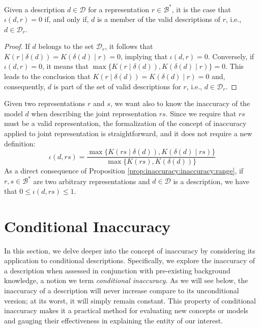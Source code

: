 \begin{proposition}\label{prop:perfect_description}
Given a description $d \in \mathcal{D}$ for a representation $r \in \mathcal{B}^\ast$, it is the case that $\iota(d, r) = 0$ if, and only if, $d$ is a member of the valid descriptions of $r$, i.e., $d \in \mathcal{D}_r$.
\end{proposition}
\begin{proof}
If $d$ belongs to the set $\mathcal{D}_r$, it follows that $K \left( r \mid \delta(d) \right) = K \left( \delta(d) \mid r \right) = 0$, implying that $\iota(d, r) = 0$. Conversely, if $\iota(d, r) = 0$, it means that $\max\{ K \left( r \mid \delta(d) \right), K \left( \delta(d) \mid r \right) \} = 0$. This leads to the conclusion that $K \left( r \mid \delta(d) \right) = K \left( \delta(d) \mid r \right) = 0$ and, consequently, $d$ is part of the set of valid descriptions for $r$, i.e., $d \in \mathcal{D}_r$.
\end{proof}

Given two representations $r$ and $s$, we want also to know the inaccuracy of the model $d$ when describing the joint representation $rs$. Since we require that $rs$ must be a valid representation, the formalization of the concept of inaccuracy applied to joint representation is straightforward, and it does not require a new definition:
\[
\iota(d, rs) = \frac{ \max\{ K \left(rs \mid \delta(d) \right), K \left( \delta(d) \mid rs \right) \} } { \max\{ K(rs), K \left(\delta(d) \right) \} }
\]
As a direct consequence of Proposition \ref{prop:inaccuracy:inaccuracy:range}, if $r, s \in \mathcal{B}^\ast$ are two arbitrary representations and $d \in \mathcal{D}$ is a description, we have that $0 \leq \iota(d, rs) \leq 1$.

%
%

\section{Conditional Inaccuracy}

In this section, we delve deeper into the concept of inaccuracy by considering its application to conditional descriptions. Specifically, we explore the inaccuracy of a description when assessed in conjunction with pre-existing background knowledge, a notion we term \emph{conditional inaccuracy}. As we will see below, the inaccuracy of a description will never increase compare to its unconditional version; at its worst, it will simply remain constant. This property of conditional inaccuracy makes it a practical method for evaluating new concepts or models and gauging their effectiveness in explaining the entity of our interest.

